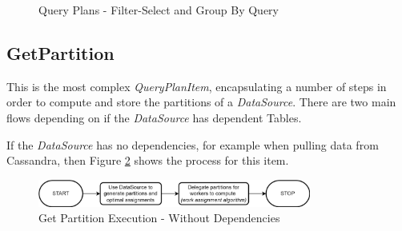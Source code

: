 \begin{figure}
	\centering
	\qquad
	\caption{Query Plans - Filter-Select and Group By Query}%
	\label{fig:filter-group-by-query-plan}
\end{figure}

\subsection{GetPartition}
This is the most complex \textit{QueryPlanItem}, encapsulating a number of steps in order to compute and store the partitions of a \textit{DataSource}. There are two main flows depending on if the \textit{DataSource} has dependent Tables.

If the \textit{DataSource} has no dependencies, for example when pulling data from Cassandra, then Figure \ref{fig:get-partition-no-dependencies} shows the process for this item. 

\begin{figure}[h]
	\centering
	\includegraphics[width=0.8\textwidth]{chapters/diagrams/implementation/get-partition-no-dependencies-flow}
	\caption{Get Partition Execution - Without Dependencies}
	\label{fig:get-partition-no-dependencies}
\end{figure}

